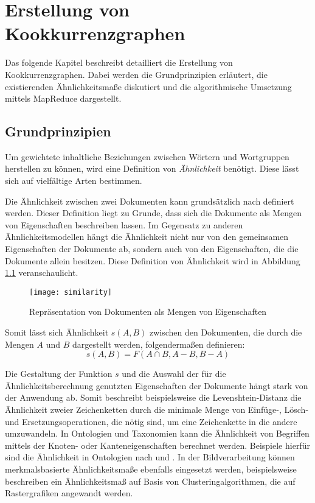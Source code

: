 \chapter{Erstellung von Kookkurrenzgraphen}

Das folgende Kapitel beschreibt detailliert die Erstellung von Kookkurrenzgraphen. Dabei werden die Grundprinzipien erläutert, die existierenden Ähnlichkeitsmaße diskutiert und die algorithmische Umsetzung mittels MapReduce dargestellt.

\section{Grundprinzipien}

Um gewichtete inhaltliche Beziehungen zwischen Wörtern und Wortgruppen herstellen zu können, wird eine Definition von \emph{Ähnlichkeit} benötigt. Diese lässt sich auf vielfältige Arten bestimmen.

Die Ähnlichkeit zwischen zwei Dokumenten kann grundsätzlich nach \textcite{at1977} definiert werden. Dieser Definition liegt zu Grunde, dass sich die Dokumente als Mengen von Eigenschaften beschreiben lassen. Im Gegensatz zu anderen Ähnlichkeitsmodellen hängt die Ähnlichkeit nicht nur von den gemeinsamen Eigenschaften der Dokumente ab, sondern auch von den Eigenschaften, die die Dokumente allein besitzen. Diese Definition von Ähnlichkeit wird in Abbildung \ref{fig:similarity} veranschaulicht.

\begin{figure}
\centering
\texttt{[image: similarity]}
\caption{Repräsentation von Dokumenten als Mengen von Eigenschaften}
\label{fig:similarity}
\end{figure}

Somit lässt sich Ähnlichkeit \(s(A,B)\) zwischen den Dokumenten, die durch die Mengen \(A\) und \(B\) dargestellt werden, folgendermaßen definieren:
\[s(A,B) = F(A \cap B, A-B, B-A)\]
\label{similarity}

Die Gestaltung der Funktion \(s\) und die Auswahl der für die Ähnlichkeitsberechnung genutzten Eigenschaften der Dokumente hängt stark von der Anwendung ab. Somit beschreibt beispielsweise die Levenshtein-Distanz \cite{vl1966} die Ähnlichkeit zweier Zeichenketten durch die minimale Menge von Einfüge-, Lösch- und Ersetzungsoperationen, die nötig sind, um eine Zeichenkette in die andere umzuwandeln. In Ontologien und Taxonomien kann die Ähnlichkeit von Begriffen mittels der Knoten- oder Kanteneigenschaften berechnet werden. Beispiele hierfür sind die Ähnlichkeit in Ontologien nach \textcite{pr1995} und \textcite{ps2002}. In der Bildverarbeitung können merkmalsbasierte Ähnlichkeitsmaße ebenfalls eingesetzt werden, beispielsweise beschreiben \textcite{ow2006} ein Ähnlichkeitsmaß auf Basis von Clusteringalgorithmen, die auf Rastergrafiken angewandt werden.

